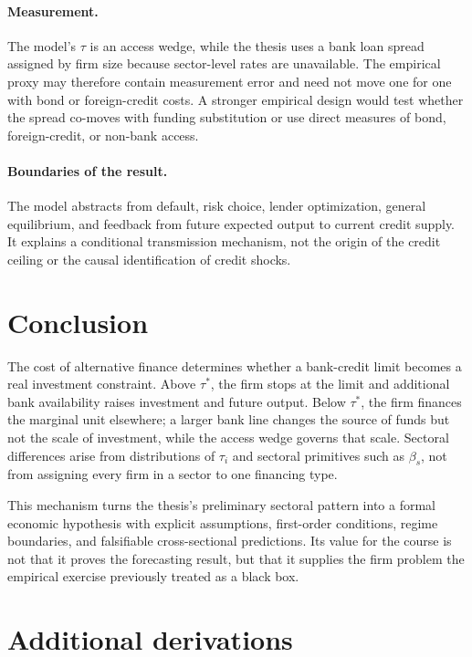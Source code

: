 \documentclass[11pt]{article}
\theoremstyle{definition}
\theoremstyle{remark}
\begin{document}
\paragraph{Measurement.}
The model's $\tau$ is an access wedge, while the thesis uses a bank loan spread
assigned by firm size because sector-level rates are unavailable. The empirical
proxy may therefore contain measurement error and need not move one for one
with bond or foreign-credit costs. A stronger empirical design would test
whether the spread co-moves with funding substitution or use direct measures of
bond, foreign-credit, or non-bank access.

\paragraph{Boundaries of the result.}
The model abstracts from default, risk choice, lender optimization, general
equilibrium, and feedback from future expected output to current credit supply.
It explains a conditional transmission mechanism, not the origin of the
credit ceiling or the causal identification of credit shocks.

\section{Conclusion}

The cost of alternative finance determines whether a bank-credit limit becomes
a real investment constraint. Above $\tau^*$, the firm stops at the limit and
additional bank availability raises investment and future output. Below
$\tau^*$, the firm finances the marginal unit elsewhere; a larger bank line
changes the source of funds but not the scale of investment, while the access
wedge governs that scale. Sectoral differences arise from distributions of
$\tau_i$ and sectoral primitives such as $\beta_s$, not from assigning every
firm in a sector to one financing type.

This mechanism turns the thesis's preliminary sectoral pattern into a formal
economic hypothesis with explicit assumptions, first-order conditions, regime
boundaries, and falsifiable cross-sectional predictions. Its value for the
course is not that it proves the forecasting result, but that it supplies the
firm problem the empirical exercise previously treated as a black box.

\appendix
\section{Additional derivations}
\end{document}
